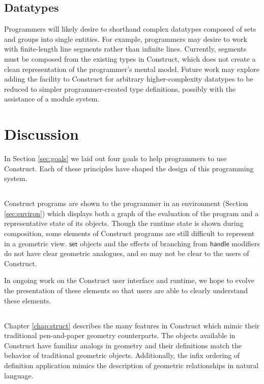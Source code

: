 \documentclass[twoside,openright,11pt]{report}
\begin{document}
\subsection{Datatypes}

Programmers will likely desire to shorthand complex datatypes composed of sets and groups into single entities. 
For example, programmers may desire to work with finite-length line segments rather than infinite lines.
Currently, segments must be composed from the existing types in Construct, which does not create a clean representation of the programmer's mental model.
Future work may explore adding the facility to Construct for arbitrary higher-complexity datatypes to be reduced to simpler programmer-created type definitions, possibly with the assistance of a module system.

\section{Discussion}
\label{sec:discuss}

In Section \ref{sec:goals} we laid out four goals to help programmers to use Construct. Each of these principles have shaped the design of this programming system.

\subsection{\constructgoalsclear}

Construct programs are shown to the programmer in an environment (Section \ref{sec:environ}) which displays both a graph of the evaluation of the program and a representative state of its objects.
Though the runtime state is shown during composition, some elements of Construct programs are still difficult to represent in a geometric view. 
$\mathsf{set}$ objects and the effects of branching from $\mathsf{handle}$ modifiers do not have clear geometric analogues, and so may not be clear to the users of Construct.

In ongoing work on the Construct user interface and runtime, we hope to evolve the presentation of these elements so that users are able to clearly understand these elements.

\subsection{\constructgoalsnative}

Chapter \ref{chap:struct} describes the many features in Construct which mimic their traditional pen-and-paper geometry counterparts.
The objects available in Construct have familiar analogs in geometry and their definitions match the behavior of traditional geometric objects. 
Additionally, the infix ordering of definition application mimics the description of geometric relationships in natural language.
\end{document}
